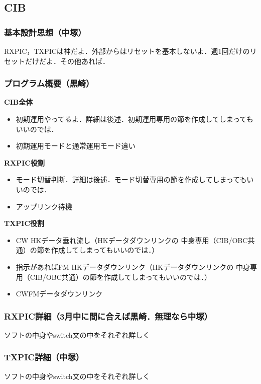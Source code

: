
\subsection{CIB}
\subsubsection{基本設計思想（中塚）}
RXPIC，TXPICは神だよ．外部からはリセットを基本しないよ．週1回だけのリセットだけだよ．その他あれば．

\subsubsection{プログラム概要（黒崎）}
\textbf{CIB全体}
\begin{itemize}
	\item 初期運用やってるよ．詳細は後述．初期運用専用の節を作成してしまってもいいのでは．
	\item 初期運用モードと通常運用モード違い
\end{itemize}

\textbf{RXPIC役割}
\begin{itemize}
	\item モード切替判断．詳細は後述．モード切替専用の節を作成してしまってもいいのでは．
	\item アップリンク待機
\end{itemize}

\textbf{TXPIC役割}
\begin{itemize}
	\item CW HKデータ垂れ流し（HKデータダウンリンクの
	中身専用（CIB/OBC共通）の節を作成してしまってもいいのでは．）
	\item 指示があればFM HKデータダウンリンク（HKデータダウンリンクの
	中身専用（CIB/OBC共通）の節を作成してしまってもいいのでは．）
	\item CWFMデータダウンリンク
\end{itemize}

\subsubsection{RXPIC詳細（3月中に間に合えば黒崎．無理なら中塚）}
ソフトの中身やswitch文の中をそれぞれ詳しく

\subsubsection{TXPIC詳細（中塚）}
ソフトの中身やswitch文の中をそれぞれ詳しく


